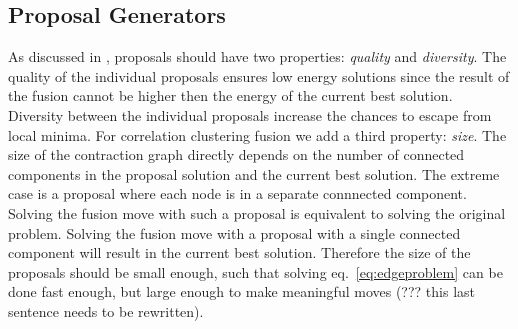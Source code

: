 \documentclass[10pt,twocolumn,letterpaper]{article}
\newtheorem{theorem}{Theorem}
\newtheorem{remark}{Remark}
\theoremstyle{definition}
\newcommand{\OR}{\textrm{ or }}
\begin{document}






\subsection{Proposal Generators}

As discussed in \cite{Lempitsky-2010}, proposals
should have two properties: \emph{quality} 
and \emph{diversity}.
%
The quality of the individual proposals
ensures low energy solutions since the
result of the fusion cannot be higher then
the energy of the current best solution.
%
Diversity between the individual proposals
increase the chances to escape from local minima.
%
For correlation clustering fusion we add a third
property: \emph{size}.
The size of the contraction graph directly
depends on the number of connected components
in the proposal solution and the current best solution.
The extreme  case is a proposal where each 
node is in a separate connnected component.
Solving the fusion move with such a proposal
is equivalent to solving the original problem.
Solving the fusion move with a proposal with 
a single connected component will result 
in the current best solution.
Therefore the size of the proposals
should be small enough, such that solving
eq.~\ref{eq:edgeproblem} can
be done fast enough, but large enough to make
meaningful moves (??? this last sentence needs to be rewritten).
\end{document}
